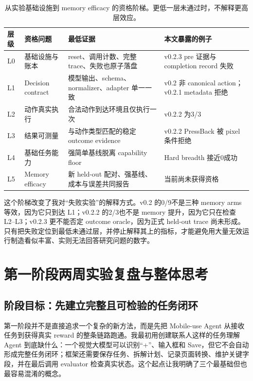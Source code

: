 \documentclass[12pt,a4paper]{ctexart}
\begin{document}
\begin{table}[H]
    \centering
    \caption{从实验基础设施到 memory efficacy 的资格阶梯。更低一层未通过时，不解释更高层效应。}
    \label{tab:qualification-ladder}
    \small
    \begin{tabularx}{\textwidth}{p{1.0cm}p{3.2cm}p{4.7cm}Y}
        \toprule
        层级 & 资格问题 & 最低证据 & 本文暴露的例子 \\
        \midrule
        L0 & 基础设施与账本 & reset、调用计数、完整 trace、失败也原子落盘 & v0.2.3 pre 证据与 completion record 失败 \\
        L1 & Decision contract & 模型输出、schema、normalizer、adapter 单一一致 & v0.2 非 canonical action；v0.2.1 metadata 拒绝 \\
        L2 & 动作真实执行 & 合法动作到达环境且仅执行一次 & v0.2.2 为3/3 \\
        L3 & 结果可测量 & 与动作类型匹配的稳定 outcome evidence & v0.2.2 PressBack 被 pixel 条件拒绝 \\
        L4 & 基础任务能力 & 强简单基线脱离 capability floor & Hard breadth 接近0成功 \\
        L5 & Memory efficacy & 新 held-out 配对、强基线、成本与误差共同报告 & 当前尚未获得资格 \\
        \bottomrule
    \end{tabularx}
\end{table}

这个阶梯改变了我对“失败实验”的解释方式。v0.2 的0/9不是三种 memory arms 等效，因为它只到达 L1；v0.2.2 的2/3也不是 memory 提升，因为它只在检查 L2--L3；v0.2.3 更不能否定 outcome oracle，因为正式 held-out trace 尚未形成。只有把失败定位到最低未通过层，并停止解释其上的指标，才能避免用大量无效运行制造看似丰富、实则无法回答研究问题的数字。

\section{第一阶段两周实验复盘与整体思考}

\subsection{阶段目标：先建立完整且可检验的任务闭环}

第一阶段并不是直接追求一个复杂的新方法，而是先把 Mobile-use Agent 从接收任务到获得真实 reward 的整条链路跑通。我最初用创建联系人这样的任务理解 Agent 到底缺什么：一个视觉大模型可以识别“+”、输入框和 Save，但它不会自动形成完整任务闭环；框架还需要保存任务、拆解计划、记录页面转换、维护关键字段，并在最后调用 evaluator 检查真实状态。这个起点让我明确了三个最基础但也最容易混淆的概念。
\end{document}
